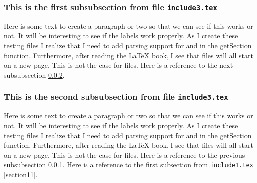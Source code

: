 ﻿\subsubsection{This is the first subsubsection from file \texttt{include3.tex}}
\label{section31}

Here is some text to create a paragraph or two so that we
can see if this works or not.  It will be interesting to see
if the labels work properly.  As I create these testing files
I realize that I need to add parsing support for \verb##
and \verb## in the getSection function.   Furthermore,
after reading the \LaTeX{} book, I see that \verb## 
files will all start on a new page.  This is not the case for
\verb## files.  Here is a reference to the next subsubsection \ref{section32}.

\subsubsection{This is the second subsubsection from file \texttt{include3.tex}}
\label{section32}

Here is some text to create a paragraph or two so that we
can see if this works or not.  It will be interesting to see
if the labels work properly.  As I create these testing files
I realize that I need to add parsing support for \verb##
and \verb## in the getSection function.   Furthermore,
after reading the \LaTeX{} book, I see that \verb## 
files will all start on a new page.  This is not the case for
\verb## files.  Here is a reference to the previous subsubsection \ref{section31}.
Here is a reference to the first subsection from \texttt{include1.tex}
\ref{section11}.
